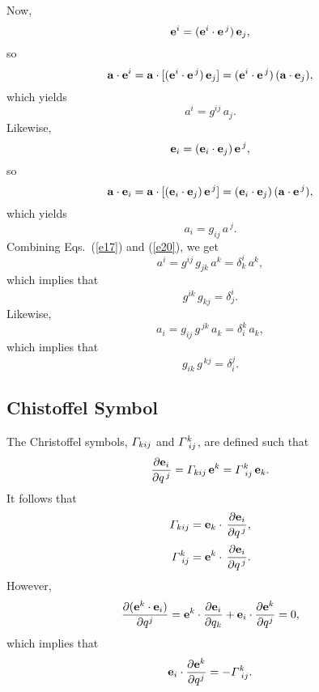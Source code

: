 \documentclass[12pt,prb,aps,notitlepage]{revtex4-1}
\begin{document}
 Now, 
 \begin{equation}
 {\bf e}^i = ({\bf e}^i\cdot{\bf e}^{\,j})\,{\bf e}_j,
 \end{equation}
so
\begin{equation}
{\bf a}\cdot{\bf e}^i = {\bf a}\cdot[ ({\bf e}^i\cdot{\bf e}^{\,j})\,{\bf e}_j]=( {\bf e}^i\cdot{\bf e}^{\,j})\,({\bf a}\cdot{\bf e}_j),
\end{equation}
which yields
\begin{equation}\label{e17}
a^i = g^{ij}\,a_j.
\end{equation}
Likewise, 
\begin{equation}
 {\bf e}_i = ({\bf e}_i\cdot{\bf e}_j)\,{\bf e}^{\,j},
 \end{equation}
so 
\begin{equation}
{\bf a}\cdot{\bf e}_i = {\bf a}\cdot[ ({\bf e}_i\cdot{\bf e}_j)\,{\bf e}^{\,j}]= ({\bf e}_i\cdot{\bf e}_j)\,({\bf a}\cdot{\bf e}^{\,j}),
\end{equation}
which yields
\begin{equation}\label{e20}
a_i = g_{ij}\,a^{\,j}.
\end{equation}
Combining Eqs.~(\ref{e17}) and (\ref{e20}), we get
\begin{equation}
a^i = g^{ij}\,g_{jk}\,a^k = \delta^{i}_k\,a^k,
\end{equation}
which implies that
\begin{equation}
g^{ik}\,g_{kj}= \delta^{i}_j.
\end{equation}
Likewise, 
\begin{equation}
a_i = g_{ij}\,g^{\,jk}\,a_k = \delta_{i}^k\,a_k,
\end{equation}
which implies that
\begin{equation}
g_{ik}\,g^{\,kj}= \delta_{i}^j.
\end{equation}

\subsection{Chistoffel Symbol}
The Christoffel symbols, ${\mit\Gamma}_{kij}$ and ${\mit\Gamma}^k_{\,\,ij}$, are defined such that 
\begin{equation}\label{e25}
\frac{\partial {\bf e}_i}{\partial q^{\,j}} = {\mit\Gamma}_{kij}\,{\bf e}^k= {\mit\Gamma}^k_{\,\,ij}\,{\bf e}_k.
\end{equation}
It follows that 
\begin{align}
{\mit\Gamma}_{kij} &= {\bf e}_k\cdot\,\frac{\partial {\bf e}_i}{\partial q^{\,j}},\\[0.5ex]
{\mit\Gamma}^k_{\,\,ij} &= {\bf e}^k\cdot\,\frac{\partial {\bf e}_i}{\partial q^{\,j}}.
\end{align}
However,
\begin{equation}
\frac{\partial ({\bf e}^k\cdot{\bf e}_i)}{\partial q^j} ={\bf e}^k \cdot\frac{\partial {\bf e}_i}{\partial q_k} + {\bf e}_i\cdot\frac{\partial{\bf e}^k}{\partial q^j}
= 0,
\end{equation}
which implies that
\begin{equation}\label{e27}
{\bf e}_i\cdot\frac{\partial{\bf e}^k}{\partial q^j}= - {\mit\Gamma}^k_{\,\,ij}.
\end{equation}
\end{document}
